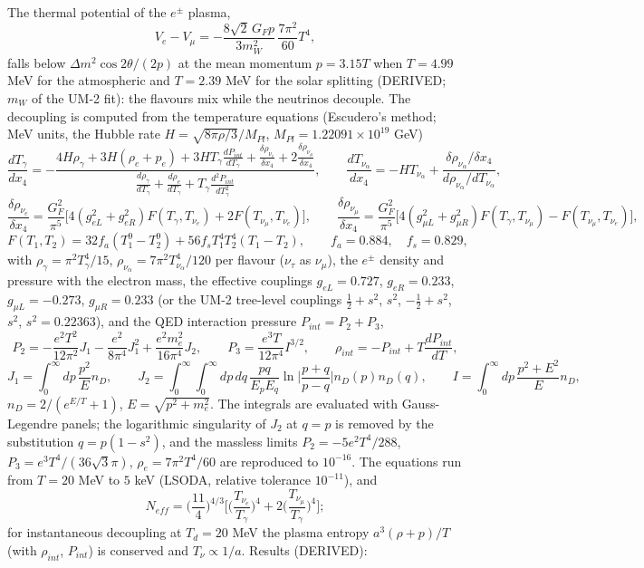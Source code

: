 \documentclass[
  10pt,
]{article}
\begin{document}
The thermal potential of the \(e^\pm\) plasma,
\[ V_e - V_\mu = -\frac{8\sqrt2\,G_Fp}{3m_W^2}\,\frac{7\pi^2}{60}T^4 , \]
falls below \(\Delta m^2\cos2\theta/(2p)\) at the mean momentum
\(p = 3.15T\) when \(T = 4.99\) MeV for the atmospheric and \(T = 2.39\)
MeV for the solar splitting (DERIVED; \(m_W\) of the UM-2 fit): the
flavours mix while the neutrinos decouple. The decoupling is computed
from the temperature equations (Escudero's method; MeV units, the Hubble
rate \(H = \sqrt{8\pi\rho/3}/M_{Pl}\), \(M_{Pl} = 1.22091\times10^{19}\)
GeV)
\[ \frac{dT_\gamma}{dx_4} = -\frac{4H\rho_\gamma + 3H(\rho_e + p_e) + 3HT_\gamma\frac{dP_{int}}{dT_\gamma} + \frac{\delta\rho_{\nu_e}}{\delta x_4} + 2\frac{\delta\rho_{\nu_\mu}}{\delta x_4}}
   {\frac{d\rho_\gamma}{dT_\gamma} + \frac{d\rho_e}{dT_\gamma} + T_\gamma\frac{d^2P_{int}}{dT_\gamma^2}},\qquad
   \frac{dT_{\nu_\alpha}}{dx_4} = -HT_{\nu_\alpha} + \frac{\delta\rho_{\nu_\alpha}/\delta x_4}{d\rho_{\nu_\alpha}/dT_{\nu_\alpha}}, \]
\[ \frac{\delta\rho_{\nu_e}}{\delta x_4} = \frac{G_F^2}{\pi^5}\Big[4(g_{eL}^2 + g_{eR}^2)F(T_\gamma, T_{\nu_e}) + 2F(T_{\nu_\mu}, T_{\nu_e})\Big],\qquad
   \frac{\delta\rho_{\nu_\mu}}{\delta x_4} = \frac{G_F^2}{\pi^5}\Big[4(g_{\mu L}^2 + g_{\mu R}^2)F(T_\gamma, T_{\nu_\mu}) - F(T_{\nu_\mu}, T_{\nu_e})\Big], \]
\[ F(T_1, T_2) = 32f_a(T_1^9 - T_2^9) + 56f_sT_1^4T_2^4(T_1 - T_2),\qquad f_a = 0.884,\quad f_s = 0.829, \]
with \(\rho_\gamma = \pi^2T_\gamma^4/15\),
\(\rho_{\nu_\alpha} = 7\pi^2T_{\nu_\alpha}^4/120\) per flavour
(\(\nu_\tau\) as \(\nu_\mu\)), the \(e^\pm\) density and pressure with
the electron mass, the effective couplings \(g_{eL} = 0.727\),
\(g_{eR} = 0.233\), \(g_{\mu L} = -0.273\), \(g_{\mu R} = 0.233\) (or
the UM-2 tree-level couplings \(\frac12 + s^2\), \(s^2\),
\(-\frac12 + s^2\), \(s^2\), \(s^2 = 0.22363\)), and the QED interaction
pressure \(P_{int} = P_2 + P_3\),
\[ P_2 = -\frac{e^2T^2}{12\pi^2}J_1 - \frac{e^2}{8\pi^4}J_1^2 + \frac{e^2m_e^2}{16\pi^4}J_2,\qquad P_3 = \frac{e^3T}{12\pi^4}I^{3/2},\qquad \rho_{int} = -P_{int} + T\frac{dP_{int}}{dT}, \]
\[ J_1 = \int_0^\infty dp\,\frac{p^2}{E}n_D,\qquad J_2 = \int_0^\infty\!\!\int_0^\infty dp\,dq\,\frac{pq}{E_pE_q}\ln\Big\lvert\frac{p + q}{p - q}\Big\rvert n_D(p)n_D(q),\qquad
   I = \int_0^\infty dp\,\frac{p^2 + E^2}{E}n_D, \]
\(n_D = 2/(e^{E/T} + 1)\), \(E = \sqrt{p^2 + m_e^2}\). The integrals are
evaluated with Gauss-Legendre panels; the logarithmic singularity of
\(J_2\) at \(q = p\) is removed by the substitution \(q = p(1 - s^2)\),
and the massless limits \(P_2 = -5e^2T^4/288\),
\(P_3 = e^3T^4/(36\sqrt3\pi)\), \(\rho_e = 7\pi^2T^4/60\) are reproduced
to \(10^{-16}\). The equations run from \(T = 20\) MeV to \(5\) keV
(LSODA, relative tolerance \(10^{-11}\)), and
\[ N_{eff} = \Big(\frac{11}{4}\Big)^{4/3}\Big[\Big(\frac{T_{\nu_e}}{T_\gamma}\Big)^4 + 2\Big(\frac{T_{\nu_\mu}}{T_\gamma}\Big)^4\Big]; \]
for instantaneous decoupling at \(T_d = 20\) MeV the plasma entropy
\(a^3(\rho + p)/T\) (with \(\rho_{int}\), \(P_{int}\)) is conserved and
\(T_\nu \propto 1/a\). Results (DERIVED):
\end{document}

